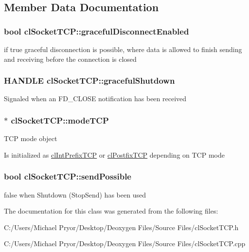 \subsection{Member Data Documentation}
\hypertarget{classcl_socket_t_c_p_a6e949c2c5e772c5b043ff92c22268753}{
\subsubsection[{gracefulDisconnectEnabled}]{\setlength{\rightskip}{0pt plus 5cm}bool {\bf clSocketTCP::gracefulDisconnectEnabled}}}
\label{classcl_socket_t_c_p_a6e949c2c5e772c5b043ff92c22268753}
if true graceful disconnection is possible, where data is allowed to finish sending and receiving before the connection is closed \hypertarget{classcl_socket_t_c_p_a0a32a324e96a95cd037a06d71b767008}{
\subsubsection[{gracefulShutdown}]{\setlength{\rightskip}{0pt plus 5cm}HANDLE {\bf clSocketTCP::gracefulShutdown}}}
\label{classcl_socket_t_c_p_a0a32a324e96a95cd037a06d71b767008}
Signaled when an {\ttfamily FD\_\-CLOSE} notification has been received \hypertarget{classcl_socket_t_c_p_ac2e53997bca4ebcb0486b29b40ad9e65}{
\subsubsection[{modeTCP}]{$\ast$ {\bf clSocketTCP::modeTCP}}}
\label{classcl_socket_t_c_p_ac2e53997bca4ebcb0486b29b40ad9e65}
TCP mode object \par
 Is initialized as \hyperlink{classcl_int_prefix_t_c_p}{clIntPrefixTCP} or \hyperlink{classcl_postfix_t_c_p}{clPostfixTCP} depending on TCP mode \hypertarget{classcl_socket_t_c_p_add406cee5019b329709c8fc557d3b64e}{
\subsubsection[{sendPossible}]{\setlength{\rightskip}{0pt plus 5cm}bool {\bf clSocketTCP::sendPossible}}}
\label{classcl_socket_t_c_p_add406cee5019b329709c8fc557d3b64e}
false when Shutdown (StopSend) has been used 

The documentation for this class was generated from the following files:\begin{DoxyCompactItemize}
\item 
C:/Users/Michael Pryor/Desktop/Deoxygen Files/Source Files/clSocketTCP.h\item 
C:/Users/Michael Pryor/Desktop/Deoxygen Files/Source Files/clSocketTCP.cpp\end{DoxyCompactItemize}
